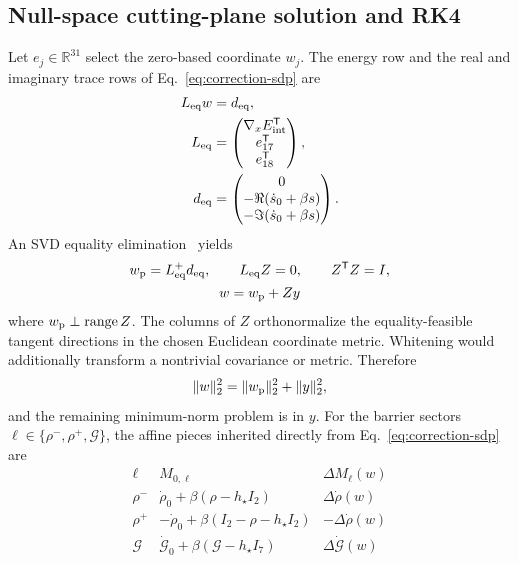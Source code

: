 \documentclass[10pt,twocolumn]{article}
\newcommand{\R}{\mathbb R}
\newcommand{\I}{I}
\newcommand{\norm}[1]{\lVert#1\rVert}
\begin{document}
\subsection{Null-space cutting-plane solution and RK4}

Let $e_j\in\R^{31}$ select the zero-based coordinate $w_j$.  The energy row
and the real and imaginary trace rows of Eq.~\eqref{eq:correction-sdp} are
\begin{equation}
\begin{aligned}
L_{\rm eq}w&=d_{\rm eq},\\
L_{\rm eq}&=\begin{pmatrix}
\nabla_xE_{\rm int}^{\mathsf T}\\ e_{17}^{\mathsf T}\\e_{18}^{\mathsf T}
\end{pmatrix},\\
d_{\rm eq}&=\begin{pmatrix}
0\\-\Re(\dot s_0+\beta s)\\-\Im(\dot s_0+\beta s)
\end{pmatrix}.
\end{aligned}
\label{eq:equality-system}
\end{equation}
An SVD equality elimination~\cite{boydVandenberghe2004} yields
\begin{equation}
\begin{gathered}
w_{\rm p}=L_{\rm eq}^+d_{\rm eq},\qquad L_{\rm eq}Z=0,
\qquad Z^\mathsf TZ=\I,\\
w=w_{\rm p}+Zy
\end{gathered}
\label{eq:nullspace}
\end{equation}
where $w_{\rm p}\perp\operatorname{range}Z$.  The columns of $Z$
orthonormalize the equality-feasible tangent directions in the chosen
Euclidean coordinate metric.  Whitening would additionally transform a
nontrivial covariance or metric.  Therefore
\begin{equation}
\norm{w}_2^2=\norm{w_{\rm p}}_2^2+\norm y_2^2,
\label{eq:nullspace-norm}
\end{equation}
and the remaining minimum-norm problem is in $y$.  For the barrier sectors
$\ell\in\{\rho^-,\rho^+,\mathcal G\}$, the affine pieces inherited directly
from Eq.~\eqref{eq:correction-sdp} are
{\scriptsize
\begin{equation}
\begin{array}{c|c|c}
\ell&M_{0,\ell}&\Delta M_\ell(w)\\ \hline
\rho^-&\dot\rho_0+\beta(\rho-h_\star\I_2)&\Delta\dot\rho(w)\\
\rho^+&-\dot\rho_0+\beta(\I_2-\rho-h_\star\I_2)&-\Delta\dot\rho(w)\\
\mathcal G&\dot{\mathcal G}_0+\beta(\mathcal G-h_\star\I_7)
&\Delta\dot{\mathcal G}(w)
\end{array}
\label{eq:barrier-pieces}
\end{equation}}
\end{document}
